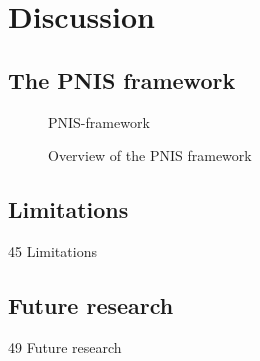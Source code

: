\section{Discussion}
\label{sec:Discussion}

\subsection{The PNIS framework}
\begin{figure}[htp]
    \centering
    {PNIS-framework}
    \caption{Overview of the PNIS framework}
    \label{fig:PNIS-framework}
\end{figure}



\subsection{Limitations}
{45 Limitations}

\subsection{Future research}
{49 Future research}